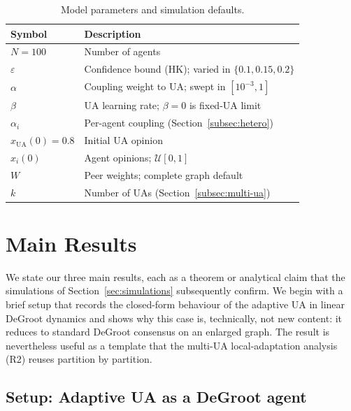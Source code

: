 \documentclass{article}
\theoremstyle{plain}
\theoremstyle{definition}
\theoremstyle{remark}
\newcommand{\xUA}{x_{\mathrm{UA}}}
\begin{document}
\begin{table}[h]
\centering
\caption{Model parameters and simulation defaults.}
\label{tab:params}
\vskip 0.15in
\begin{center}
\begin{small}
\begin{tabular}{@{}lp{}@{}}
\toprule
Symbol & Description \\
\midrule
$N=100$         & Number of agents \\
$\varepsilon$   & Confidence bound (HK); varied in $\{0.1,0.15,0.2\}$\\
$\alpha$        & Coupling weight to UA; swept in $[10^{-3},1]$ \\
$\beta$         & UA learning rate; $\beta=0$ is fixed-UA limit \\
$\alpha_i$      & Per-agent coupling (Section~\ref{subsec:hetero})\\
$\xUA(0)=0.8$  & Initial UA opinion \\
$x_i(0)$       & Agent opinions; $\mathcal{U}[0,1]$ \\
$W$            & Peer weights; complete graph default \\
$k$            & Number of UAs (Section~\ref{subsec:multi-ua}) \\
\bottomrule
\end{tabular}
\end{small}
\end{center}
\vskip -0.1in
\end{table}

\section{Main Results}
\label{sec:results}

We state our three main results, each as a theorem or analytical
claim that the simulations of Section~\ref{sec:simulations}
subsequently confirm.  We begin with a brief setup that records the
closed-form behaviour of the adaptive UA in linear DeGroot dynamics
and shows why this case is, technically, not new content: it reduces
to standard DeGroot consensus on an enlarged graph.  The result is
nevertheless useful as a template that the multi-UA local-adaptation
analysis (R2) reuses partition by partition.

\subsection*{Setup: Adaptive UA as a DeGroot agent}
\label{subsec:setup}
\end{document}
